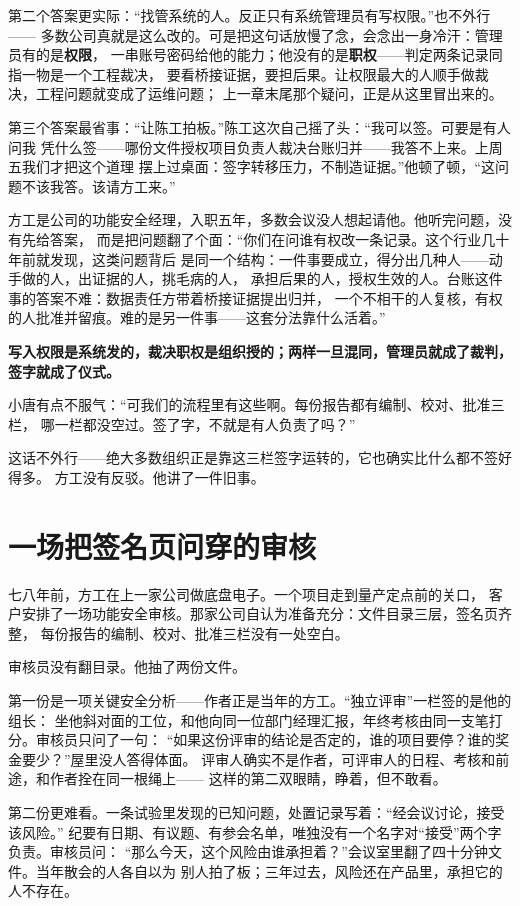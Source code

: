 第二个答案更实际：“找管系统的人。反正只有系统管理员有写权限。”也不外行——
多数公司真就是这么改的。可是把这句话放慢了念，会念出一身冷汗：管理员有的是\textbf{权限}，
一串账号密码给他的能力；他没有的是\textbf{职权}——判定两条记录同指一物是一个工程裁决，
要看桥接证据，要担后果。让权限最大的人顺手做裁决，工程问题就变成了运维问题；
上一章末尾那个疑问，正是从这里冒出来的。

第三个答案最省事：“让陈工拍板。”陈工这次自己摇了头：“我可以签。可要是有人问我
凭什么签——哪份文件授权项目负责人裁决台账归并——我答不上来。上周五我们才把这个道理
摆上过桌面：签字转移压力，不制造证据。”他顿了顿，“这问题不该我答。该请方工来。”

方工是公司的功能安全经理，入职五年，多数会议没人想起请他。他听完问题，没有先给答案，
而是把问题翻了个面：“你们在问谁有权改一条记录。这个行业几十年前就发现，这类问题背后
是同一个结构：一件事要成立，得分出几种人——动手做的人，出证据的人，挑毛病的人，
承担后果的人，授权生效的人。台账这件事的答案不难：数据责任方带着桥接证据提出归并，
一个不相干的人复核，有权的人批准并留痕。难的是另一件事——这套分法靠什么活着。”

\textbf{写入权限是系统发的，裁决职权是组织授的；两样一旦混同，管理员就成了裁判，签字就成了仪式。}

小唐有点不服气：“可我们的流程里有这些啊。每份报告都有编制、校对、批准三栏，
哪一栏都没空过。签了字，不就是有人负责了吗？”

这话不外行——绝大多数组织正是靠这三栏签字运转的，它也确实比什么都不签好得多。
方工没有反驳。他讲了一件旧事。

\section{一场把签名页问穿的审核}

七八年前，方工在上一家公司做底盘电子。一个项目走到量产定点前的关口，
客户安排了一场功能安全审核。那家公司自认为准备充分：文件目录三层，签名页齐整，
每份报告的编制、校对、批准三栏没有一处空白。

审核员没有翻目录。他抽了两份文件。

第一份是一项关键安全分析——作者正是当年的方工。“独立评审”一栏签的是他的组长：
坐他斜对面的工位，和他向同一位部门经理汇报，年终考核由同一支笔打分。审核员只问了一句：
“如果这份评审的结论是否定的，谁的项目要停？谁的奖金要少？”屋里没人答得体面。
评审人确实不是作者，可评审人的日程、考核和前途，和作者拴在同一根绳上——
这样的第二双眼睛，睁着，但不敢看。

第二份更难看。一条试验里发现的已知问题，处置记录写着：“经会议讨论，接受该风险。”
纪要有日期、有议题、有参会名单，唯独没有一个名字对“接受”两个字负责。审核员问：
“那么今天，这个风险由谁承担着？”会议室里翻了四十分钟文件。当年散会的人各自以为
别人拍了板；三年过去，风险还在产品里，承担它的人不存在。

